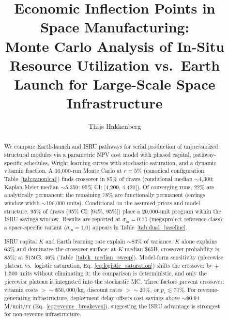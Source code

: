 \documentclass[5p,twocolumn]{elsarticle}
\begin{document}
\begin{frontmatter}

\title{Economic Inflection Points in Space Manufacturing:\\ Monte Carlo Analysis of In-Situ Resource Utilization vs.\ Earth Launch for Large-Scale Space Infrastructure}

\author[dyson]{Thijs Hakkenberg}

\address[dyson]{Project Dyson, Open Research Initiative}

\begin{abstract}
We compare Earth-launch and ISRU pathways for serial production of unpressurized structural modules via a parametric NPV cost model with phased capital, pathway-specific schedules, Wright learning curves with stochastic saturation, and a dynamic vitamin fraction. A 10{,}000-run Monte Carlo at $r = 5\%$ (canonical configuration: Table~\ref{tab:canonical}) finds crossover in 85\% of draws (conditional median ${\sim}$4{,}300; Kaplan-Meier median ${\sim}$5{,}350; 95\% CI: [4{,}200, 4{,}420]). Of converging runs, 22\% are analytically permanent; the remaining 78\% are functionally permanent (savings window width ${\sim}$196{,}000 units). Conditional on the assumed priors and model structure, 95\% of draws (95\% CI: [94\%, 95\%]) place a 20{,}000-unit program within the ISRU savings window. Results are reported at $\sigma_{\ln} = 0.70$ (megaproject reference class); a space-specific variant ($\sigma_{\ln} = 1.0$) appears in Table~\ref{tab:dual_baseline}.

ISRU capital $K$ and Earth learning rate explain ${\sim}$83\% of variance. $K$ alone explains 63\% and dominates the crossover surface: at $K$ median \$65B, crossover probability is 85\%; at \$150B, 46\% (Table~\ref{tab:k_median_sweep}). Model-form sensitivity (piecewise plateau vs.\ logistic saturation, Eq.~\ref{eq:logistic_saturation}) shifts the crossover by $\pm$1{,}500 units without eliminating it; the comparison is deterministic, and only the piecewise plateau is integrated into the stochastic MC. Three factors prevent crossover: vitamin costs $> {\sim}\$50{,}000$/kg, discount rates $> {\sim}20\%$, or $p_s \lesssim 70\%$. For revenue-generating infrastructure, deployment delay offsets cost savings above ${\sim}\$0.94$M/unit/yr (Eq.~\ref{eq:revenue_breakeven}), suggesting the ISRU advantage is strongest for non-revenue infrastructure.
\end{abstract}


\end{frontmatter}
\end{document}
